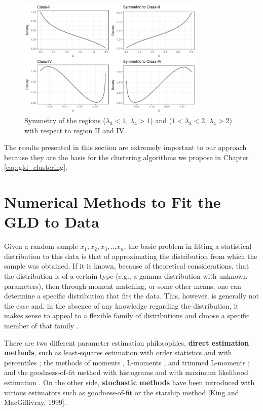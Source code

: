 \begin{figure}[H]
    \centering
    \includegraphics[width=0.8\textwidth]{img/gld/symetrics.png}
    \caption{Symmetry of the regions ($\lambda_{3}<1$, $\lambda_{4}>1$) and ($1<\lambda_{3}<2$, $\lambda_{4}>2$) with respect to  region II and IV.}
    \label{fig:symmetry}
\end{figure}

The results presented in this section are extremely important to our approach because they are the basis for the clustering algorithms we propose in Chapter \ref{cap:gld_clustering}.


\section{Numerical Methods to Fit the GLD to Data}\label{sec:gld_numerical_methods}
Given a random sample $x_{1},x_{2},x_{3},...x_{n}$, the basic problem in fitting a statistical distribution to this data is that of approximating the distribution from which the sample was obtained. If it is known, because of theoretical considerations, that the distribution is of a certain type (e.g., a gamma distribution with unknown parameters), then through moment matching, or some other means, one can determine a specific distribution that fits the data. This, however, is generally not the case and, in the absence of any knowledge regarding the distribution, it makes sense to appeal to a flexible family of distributions and choose a specific member of that family \cite{Karian2011}.

There are two different parameter estimation philosophies, \textbf{direct estimation methods}, such as least-squares estimation with order statistics and with percentiles \cite{Fournier2007, Karian2011}; the methods of moments \cite{Lodziensis2013}, L-moments \cite{Karvanen2008}, and trimmed L-moments \cite{Fournier2007}; and the goodness-of-fit method with histograms \cite{Su2005} and with maximum likelihood estimation \cite{Su2007}. On the other side, \textbf{stochastic methods} have been introduced with various estimators such as goodness-of-fit \cite{Lakhany2000} or the starship method [King and MacGillivray, 1999]. 


